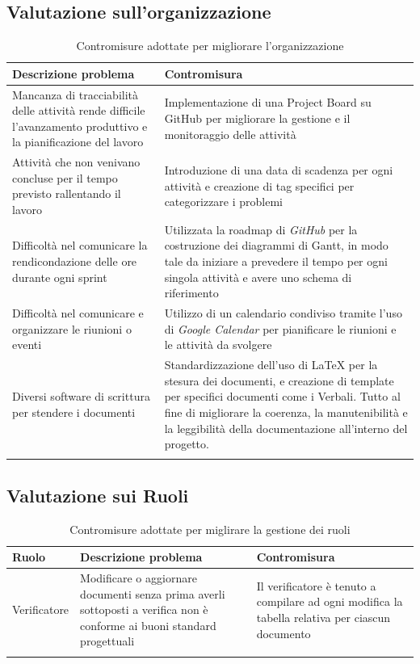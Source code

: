 \documentclass{article}
\begin{document}
\subsection{Valutazione sull'organizzazione}
\begin{center}
\begin{longtable}{|>{\centering\arraybackslash}p{}|>{\centering\arraybackslash}p{}|}
    \hline
    \textbf{Descrizione problema} & \textbf{Contromisura} \\
    \hline
    Mancanza di tracciabilità delle attività rende difficile l'avanzamento produttivo e la pianificazione del lavoro & Implementazione di una Project Board su GitHub per migliorare la gestione e il monitoraggio delle attività \\
    \hline
    Attività che non venivano concluse per il tempo previsto rallentando il lavoro & Introduzione di una data di scadenza per ogni attività e creazione di tag specifici per categorizzare i problemi \\ 
    \hline
    Difficoltà nel comunicare la rendicondazione delle ore durante ogni sprint & Utilizzata la roadmap di \textit{GitHub} per la costruzione dei diagrammi di Gantt, in modo tale da iniziare a prevedere il tempo per ogni singola attività e avere uno schema di riferimento \\
    \hline
    Difficoltà nel comunicare e organizzare le riunioni o eventi & Utilizzo di un calendario condiviso tramite l'uso di \textit{Google Calendar} per pianificare le riunioni e le attività da svolgere \\
    \hline
    Diversi software di scrittura per stendere i documenti & Standardizzazione dell'uso di \LaTeX{} per la stesura dei documenti, e creazione di template per specifici documenti come i Verbali. Tutto al fine di migliorare la coerenza, la manutenibilità e la leggibilità della documentazione all'interno del progetto. \\
    \hline
    \caption{Contromisure adottate per migliorare l'organizzazione}
\end{longtable}
\end{center}
\newpage
\subsection{Valutazione sui Ruoli}
\begin{center}
    \begin{longtable}{|>{\centering\arraybackslash}p{}|>{\centering\arraybackslash}p{}|>{\centering\arraybackslash}p{}|}
        \hline
        \textbf{Ruolo} & \textbf{Descrizione problema} & \textbf{Contromisura} \\
        \hline
        Verificatore & Modificare o aggiornare documenti senza prima averli sottoposti a verifica non è conforme ai buoni standard progettuali & Il verificatore è tenuto a compilare ad ogni modifica la tabella relativa per ciascun documento\\
        \hline %
        \caption{Contromisure adottate per miglirare la gestione dei ruoli}
    \end{longtable}
\end{center}
\newpage
\end{document}
